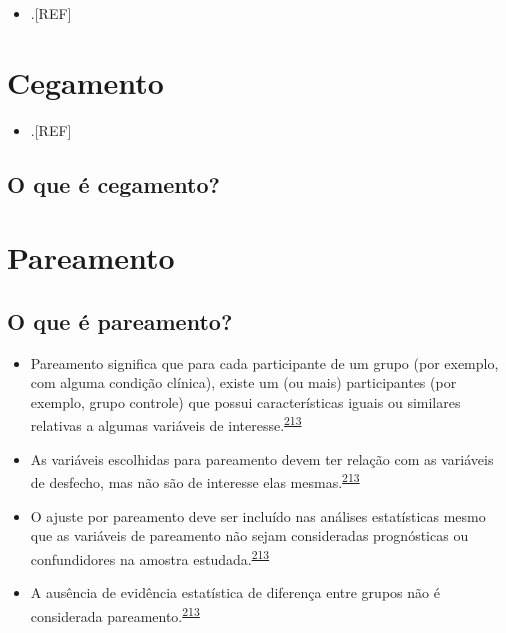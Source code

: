 \documentclass[
  a4paper,
]{book}
\providecommand{\tightlist}{%
  \setlength{\itemsep}{0pt}\setlength{\parskip}{0pt}}
\begin{document}
\begin{itemize}
\tightlist
\item
  .{[}REF{]}
\end{itemize}

\hypertarget{cegamento}{%
\section{Cegamento}\label{cegamento}}

\begin{itemize}
\tightlist
\item
  .{[}REF{]}
\end{itemize}

\hypertarget{o-que-uxe9-cegamento}{%
\subsection{O que é cegamento?}\label{o-que-uxe9-cegamento}}

\hypertarget{pareamento}{%
\section{Pareamento}\label{pareamento}}

\hypertarget{o-que-uxe9-pareamento}{%
\subsection{O que é pareamento?}\label{o-que-uxe9-pareamento}}

\begin{itemize}
\item
  Pareamento significa que para cada participante de um grupo (por exemplo, com alguma condição clínica), existe um (ou mais) participantes (por exemplo, grupo controle) que possui características iguais ou similares relativas a algumas variáveis de interesse.\textsuperscript{\protect\hyperlink{ref-Bland1994}{213}}
\item
  As variáveis escolhidas para pareamento devem ter relação com as variáveis de desfecho, mas não são de interesse elas mesmas.\textsuperscript{\protect\hyperlink{ref-Bland1994}{213}}
\item
  O ajuste por pareamento deve ser incluído nas análises estatísticas mesmo que as variáveis de pareamento não sejam consideradas prognósticas ou confundidores na amostra estudada.\textsuperscript{\protect\hyperlink{ref-Bland1994}{213}}
\item
  A ausência de evidência estatística de diferença entre grupos não é considerada pareamento.\textsuperscript{\protect\hyperlink{ref-Bland1994}{213}}
\end{itemize}
\end{document}
